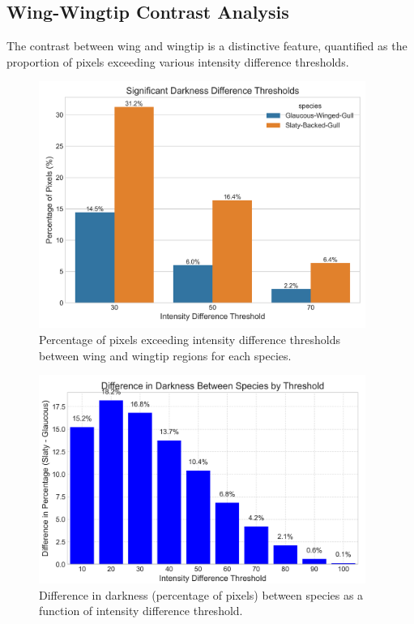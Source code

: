 \documentclass[a4paper,12pt]{report}
\begin{document}
\subsection{Wing-Wingtip Contrast Analysis}

The contrast between wing and wingtip is a distinctive feature, quantified as the proportion of pixels exceeding various intensity difference thresholds.

\begin{figure}[H]
    \centering
    \includegraphics[width=0.95\textwidth]{images/REPORT_IMAGES_INTENSITY/I1/intensitydiffthreshold2.png}
    \caption{Percentage of pixels exceeding intensity difference thresholds between wing and wingtip regions for each species.}
    \label{fig:wingtip_threshold}
\end{figure}

\begin{figure}[H]
    \centering
    \includegraphics[width=0.95\textwidth]{images/REPORT_IMAGES_INTENSITY/I1/diffbythresh.png}
    \caption{Difference in darkness (percentage of pixels) between species as a function of intensity difference threshold.}
    \label{fig:diff_by_thresh}
\end{figure}
\end{document}
